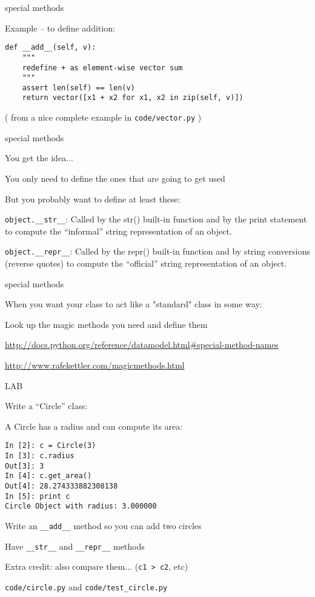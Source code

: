 \documentclass{beamer}
\begin{document}
\begin{frame}[fragile]{special methods}

{\Large Example -- to define addition:}

\begin{verbatim}
def __add__(self, v):
    """
    redefine + as element-wise vector sum
    """
    assert len(self) == len(v)
    return vector([x1 + x2 for x1, x2 in zip(self, v)])
\end{verbatim}

( from a nice complete example in \verb|code/vector.py| )

\end{frame} 


\begin{frame}[fragile]{special methods}

{\Large You get the idea...}

\vfill
{\Large You only need to define the ones that are going to get used}

\vfill
{\Large But you probably want to define at least these:}

\vfill
\verb|object.__str__|: Called by the str() built-in function and by the print statement to compute the “informal” string representation of an object.

\vfill
\verb|object.__repr__|: Called by the repr() built-in function and by string conversions (reverse quotes) to compute the “official” string representation of an object.

\end{frame} 

\begin{frame}[fragile]{special methods}

\vfill
{\Large When you want your class to act like a "standard" class in some way:}

\vfill
{\Large Look up the magic methods you need and define them}

\vfill
\url{http://docs.python.org/reference/datamodel.html#special-method-names}

\vfill
\url{http://www.rafekettler.com/magicmethods.html}
\end{frame} 

\begin{frame}[fragile]{LAB}

{\Large Write a ``Circle'' class:}


\vfill
{\large A Circle has a radius and can compute its area:}
\begin{verbatim}
In [2]: c = Circle(3)
In [3]: c.radius
Out[3]: 3
In [4]: c.get_area()
Out[4]: 28.274333882308138
In [5]: print c
Circle Object with radius: 3.000000
\end{verbatim}
{\large Write an \verb|__add__| method so you can add two circles }

\vfill
{\large Have \verb|__str__| and \verb|__repr__| methods }

\vfill
{\large Extra credit: also compare them... (\verb|c1 > c2|, etc)}

\vfill
{\large \verb|code/circle.py| and \verb|code/test_circle.py|}
\end{frame}
\end{document}
